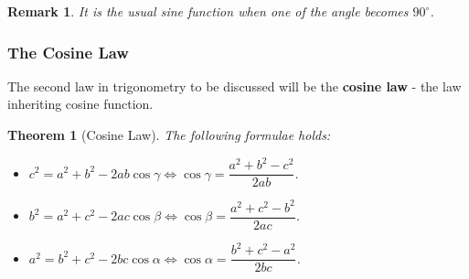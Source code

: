 \documentclass[12pt]{article}
\newtheorem*{theorem}{Theorem}
\newtheorem*{remark}{Remark}
\begin{document}
    \begin{remark}
        It is the usual sine function when one of the angle becomes $90^\circ$.
    \end{remark}

    \subsubsection*{The Cosine Law}

    The second law in trigonometry to be discussed will be the \textbf{cosine law} - the law inheriting cosine function.

    \begin{theorem}[Cosine Law]
        The following formulae holds:\begin{itemize}
            \item $c^2=a^2+b^2-2ab\cos{\gamma} \iff \cos{\gamma}=\dfrac{a^2+b^2-c^2}{2ab}$.
            \item $b^2=a^2+c^2-2ac\cos{\beta} \iff \cos{\beta}=\dfrac{a^2+c^2-b^2}{2ac}$.
            \item $a^2=b^2+c^2-2bc\cos{\alpha} \iff \cos{\alpha}=\dfrac{b^2+c^2-a^2}{2bc}$.
        \end{itemize}
    \end{theorem}
\end{document}
